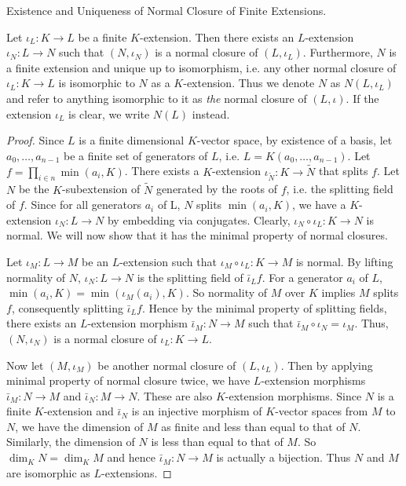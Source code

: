 \documentclass[../book.tex]{subfiles}
\begin{document}
\begin{thm} Existence and Uniqueness of Normal Closure of Finite Extensions.
    
    Let $\iota_L : K \to L$ be a finite $K$-extension. 
    Then there exists an $L$-extension $\iota_N : L \to N$ such that
    $(N,\iota_N)$ is a normal closure of $(L,\iota_L)$.
    Furthermore, $N$ is a finite extension and unique up to isomorphism, i.e.
    any other normal closure of $\iota_L : K \to L$ is
    isomorphic to $N$ as a $K$-extension. 
    Thus we denote $N$ as $N(L,\iota_L)$ and refer to anything isomorphic to it 
    as \emph{the} normal closure of $(L,\iota)$.
    If the extension $\iota_L$ is clear, we write $N(L)$ instead. 
\end{thm}
\begin{proof}
    Since $L$ is a finite dimensional $K$-vector space,
    by existence of a basis,
    let $a_0,\dots,a_{n-1}$ be a finite set of generators of $L$,
    i.e. $L = K(a_0,\dots,a_{n-1})$.
    Let $f = \prod_{i\in n} \min(a_i,K)$. 
    There exists a $K$-extension $\iota_{\tilde{N}} : K \to \tilde{N}$ 
    that splits $f$. 
    Let $N$ be the $K$-subextension of $\tilde{N}$ generated by the roots of $f$, 
    i.e. the splitting field of $f$. 
    Since for all generators $a_i$ of L, $N$ splits $\min(a_i,K)$,
    we have a $K$-extension $\iota_N : L \to N$ by embedding via conjugates.
    Clearly, $\iota_N\circ\iota_L : K \to N$ is normal. 
    We will now show that it has the minimal property of normal closures. 
    
    Let $\iota_M : L \to M$ be an $L$-extension such that 
    $\iota_M\circ\iota_L : K \to M$ is normal. 
    By lifting normality of $N$, 
    $\iota_N : L \to N$ is the splitting field of $\bar\iota_L f$. 
    For a generator $a_i$ of $L$, $\min(a_i,K) = \min(\iota_M(a_i),K)$. 
    So normality of $M$ over $K$ implies $M$ splits $f$,
    consequently splitting $\bar\iota_L f$. 
    Hence by the minimal property of splitting fields,
    there exists an $L$-extension morphism $\bar\iota_M : N \to M$
    such that $\bar\iota_M\circ\iota_N = \iota_M$. 
    Thus, $(N,\iota_N)$ is a normal closure of $\iota_L : K \to L$.
    
    Now let $(M,\iota_M)$ be another normal closure of $(L,\iota_L)$. 
    Then by applying minimal property of normal closure twice,
    we have $L$-extension morphisms $\bar\iota_M : N \to M$ 
    and $\bar\iota_N : M \to N$.
    These are also $K$-extension morphisms.
    Since $N$ is a finite $K$-extension and 
    $\bar\iota_N$ is an injective morphism of $K$-vector spaces from $M$ to $N$,
    we have the dimension of $M$ as finite and less than equal to that of $N$. 
    Similarly, the dimension of $N$ is less than equal to that of $M$.
    So $\dim_K N = \dim_K M$ and hence $\bar\iota_M : N \to M$ is actually a bijection.
    Thus $N$ and $M$ are isomorphic as $L$-extensions. 
\end{proof}
\end{document}
